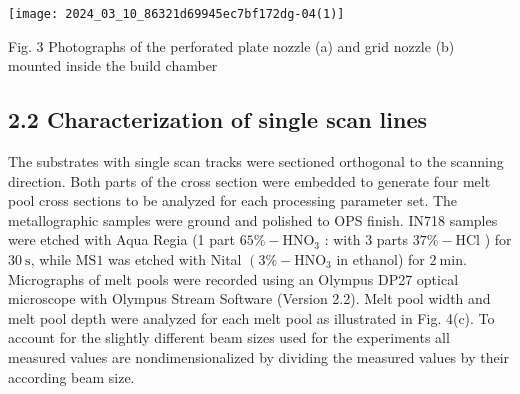 \documentclass[10pt]{article}
\begin{document}
\begin{center}
\texttt{[image: 2024\_03\_10\_86321d69945ec7bf172dg-04(1)]}
\end{center}

Fig. 3 Photographs of the perforated plate nozzle (a) and grid nozzle (b) mounted inside the build chamber

\subsection*{2.2 Characterization of single scan lines}
The substrates with single scan tracks were sectioned orthogonal to the scanning direction. Both parts of the cross section were embedded to generate four melt pool cross sections to be analyzed for each processing parameter set. The metallographic samples were ground and polished to OPS finish. IN718 samples were etched with Aqua Regia (1 part $65 \%-\mathrm{HNO}_{3}$ : with 3 parts $37 \%-\mathrm{HCl}$ ) for $30 \mathrm{~s}$, while $\mathrm{MS} 1$ was etched with Nital $\left(3 \%-\mathrm{HNO}_{3}\right.$ in ethanol) for $2 \mathrm{~min}$. Micrographs of melt pools were recorded using an Olympus DP27 optical microscope with Olympus Stream Software (Version 2.2). Melt pool width and melt pool depth were analyzed for each melt pool as illustrated in Fig. 4(c). To account for the slightly different beam sizes used for the experiments all measured values are nondimensionalized by dividing the measured values by their according beam size.
\end{document}
